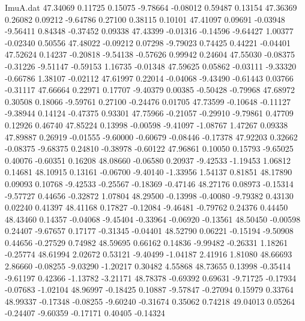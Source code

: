 \begin{filecontents}{ImuA.dat}
  47.34069    0.11725    0.15075   -9.78664   -0.08012    0.59487    0.13154
  47.36369    0.26082    0.09212   -9.64786    0.27100    0.38115    0.10101
  47.41097    0.09691   -0.03948   -9.56411    0.84348   -0.37452    0.09338
  47.43399   -0.01316   -0.14596   -9.64427    1.00377   -0.02340    0.50556
  47.48022   -0.09212    0.07298   -9.79023    0.74425    0.44221   -0.04401
  47.52624    0.14237   -0.20818   -9.54138   -0.57626    0.99942    0.24604
  47.55030   -0.08375   -0.31226   -9.51147   -0.59153    1.16735   -0.01348
  47.59625    0.05862   -0.03111   -9.33320   -0.66786    1.38107   -0.02112
  47.61997    0.22014   -0.04068   -9.43490   -0.61443    0.03766   -0.31117
  47.66664    0.22971    0.17707   -9.40379    0.00385   -0.50428   -0.79968
  47.68972    0.30508    0.18066   -9.59761    0.27100   -0.24476    0.01705
  47.73599   -0.10648   -0.11127   -9.38944    0.14124   -0.47375    0.93301
  47.75966   -0.21057   -0.29910   -9.79861    0.47709    0.12926    0.46740
  47.85224    0.13998   -0.00598   -9.41097   -1.08767    1.47267    0.09338
  47.89887    0.26919   -0.01555   -9.60000   -0.60679   -0.08446   -0.17378
  47.92203    0.32662   -0.08375   -9.68375    0.24810   -0.38978   -0.60122
  47.96861    0.10050    0.15793   -9.65025    0.40076   -0.60351    0.16208
  48.08660   -0.06580    0.20937   -9.42533   -1.19453    1.06812    0.14681
  48.10915    0.13161   -0.06700   -9.40140   -1.33956    1.54137    0.81851
  48.17890    0.09093    0.10768   -9.42533   -0.25567   -0.18369   -0.47146
  48.27176    0.08973   -0.15314   -9.57727    0.44656   -0.32872    1.07804
  48.29500   -0.13998   -0.40080   -9.79382    0.43130    0.02240    0.41397
  48.41168    0.17827   -0.12084   -9.46481   -0.79762    0.24376    0.44450
  48.43460    0.14357   -0.04068   -9.45404   -0.33964   -0.06920   -0.13561
  48.50450   -0.00598    0.24407   -9.67657    0.17177   -0.31345   -0.04401
  48.52790    0.06221   -0.15194   -9.50908    0.44656   -0.27529    0.74982
  48.59695    0.66162    0.14836   -9.99482   -0.26331    1.18261   -0.25774
  48.61994    2.02672    0.53121   -9.40499   -1.04187    2.41916    1.81080
  48.66693    2.86660   -0.08255   -9.03290   -1.20217    0.30482    4.55868
  48.73655    0.13998   -0.35414   -9.61197    0.42366   -1.13782   -3.21171
  48.78378   -0.69392    0.69631   -9.71725   -0.17934   -0.07683   -1.02104
  48.96997   -0.18425    0.10887   -9.57847   -0.27094    0.15979    0.33764
  48.99337   -0.17348   -0.08255   -9.60240   -0.31674    0.35062    0.74218
  49.04013    0.05264   -0.24407   -9.60359   -0.17171    0.40405   -0.14324

\end{filecontents}
